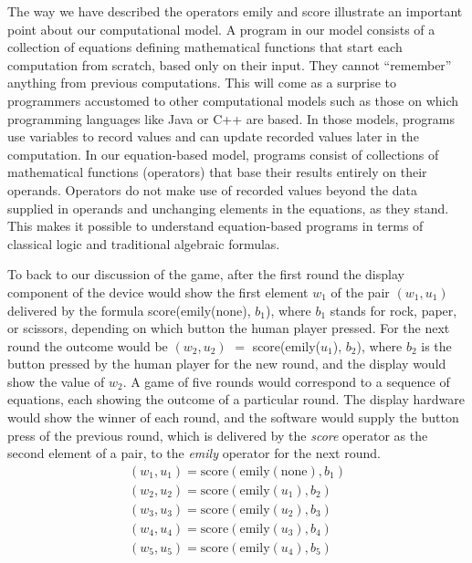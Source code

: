 The way we have described the operators \textsf{emily} and \textsf{score}
illustrate an important point about our computational model.
A program in our model consists of a collection of equations
defining mathematical functions that start each computation from scratch,
based only on their input. They cannot ``remember'' anything from previous computations.
This will come as a surprise to programmers accustomed
to other computational models such as those on which
programming languages like Java or C++ are based.
In those models, programs use variables to record values
and can update recorded values later in the computation.
In our equation-based model,
programs consist of collections of mathematical functions (operators)
that base their results entirely on their operands.
Operators do not make use of recorded values
beyond the data supplied in operands
and unchanging elements in the equations, as they stand.
This makes it possible to
understand equation-based programs in terms of classical
logic and traditional algebraic formulas.

To back to our discussion of the game,
after the first round the display component of the device
would show the first element $w_1$ of the pair $(w_1, u_1)$ delivered by the formula
\textsf{score}(\textsf{emily}(none), $b_1$),
where $b_1$ stands for rock, paper, or scissors, depending on which button
the human player pressed.
For the next round the outcome would be
$(w_2, u_2)$ $=$ \textsf{score}(\textsf{emily}($u_1$), $b_2$),
where $b_2$ is the button pressed by the human player for the new round,
and the display would show the value of $w_2$.
A game of five rounds would correspond to a sequence of equations,
each showing the outcome of a particular round.
The display hardware would show the winner of each round,
and the software would supply the button press of the previous round, which
is delivered by the \textit{score} operator as the second
element of a pair, to the \textit{emily} operator for the next round.
\begin{displaymath}
        \begin{array}{ll}
        (w_1, u_1) = \mbox{score}(\mbox{emily}(\mbox{none}), b_1) \\
        (w_2, u_2) = \mbox{score}(\mbox{emily}(u_1), b_2) \\
        (w_3, u_3) = \mbox{score}(\mbox{emily}(u_2), b_3) \\
        (w_4, u_4) = \mbox{score}(\mbox{emily}(u_3), b_4) \\
        (w_5, u_5) = \mbox{score}(\mbox{emily}(u_4), b_5)
        \end{array}
\end{displaymath}

